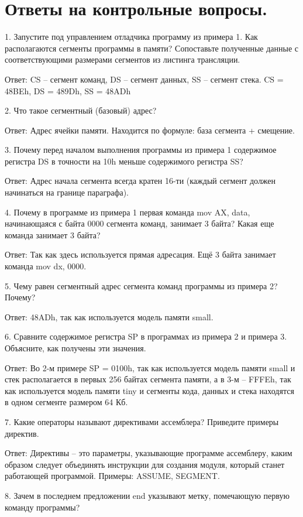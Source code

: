 \documentclass{report}
\begin{document}
\section{Ответы на контрольные вопросы.}

1.  Запустите под управлением отладчика программу из примера 1. Как располагаются сегменты программы в памяти? Сопоставьте полученные данные с соответствующими размерами сегментов из листинга трансляции.

Ответ: CS – сегмент команд, DS – сегмент данных, SS – сегмент стека. CS = 48BEh, DS = 489Dh, SS = 48ADh

2.  Что такое сегментный (базовый) адрес?

Ответ: Адрес ячейки памяти. Находится по формуле: база сегмента + смещение.

3.  Почему перед началом выполнения программы из примера 1 содержимое регистра DS в точности на 10h меньше содержимого регистра SS?

Ответ: Адрес начала сегмента всегда кратен 16-ти (каждый сегмент должен начинаться на границе параграфа).

4.  Почему в программе из примера 1 первая команда mov AX, data, начинающаяся с байта 0000 сегмента команд, занимает 3 байта? Какая еще команда занимает 3 байта?

Ответ: Так как здесь используется прямая адресация. Ещё 3 байта занимает команда mov dx, 0000.

5.  Чему равен сегментный адрес сегмента команд программы из примера 2? Почему?

Ответ: 48ADh, так как используется модель памяти small.

6.  Сравните содержимое регистра SP в программах из примера 2 и примера 3. Объясните, как получены эти значения.

Ответ: Во 2-м примере SP = 0100h, так как используется модель памяти small и стек располагается в первых 256 байтах сегмента памяти, а в 3-м – FFFEh, так как используется модель памяти tiny и сегменты кода, данных и стека находятся в одном сегменте размером 64 Кб.

7.  Какие операторы называют директивами ассемблера? Приведите примеры директив.

Ответ: Директивы – это параметры, указывающие программе ассемблеру, каким образом следует объединять инструкции для создания модуля, который станет работающей программой. Примеры: ASSUME, SEGMENT.

8.  Зачем в последнем предложении end указывают метку, помечающую первую команду программы?
\end{document}
